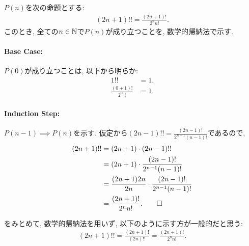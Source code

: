 \begin{proof*}
  $P(n)$を次の命題とする:
  \begin{align*}
    (2n+1)!!=\frac{(2n+1)!}{2^nn!}.
  \end{align*}
  このとき,
  全ての$n\in\mathbb{N}$で$P(n)$が成り立つことを,
  数学的帰納法で示す.

  \paragraph{Base Case:}
  $P(0)$が成り立つことは, 以下から明らか:
  \begin{align*}
    1!!&=1.\\
    \frac{(0+1)!}{2^00!}&=1.
  \end{align*}

  \paragraph{Induction Step:}
  $P(n-1)\implies P(n)$を示す.
  仮定から$(2n-1)!!=\frac{(2n-1)!}{2^{n-1}(n-1)!}$であるので,
  \begin{align*}
    (2n+1)!!
    &=(2n+1)\cdot (2n-1)!!\\
    &=(2n+1)\cdot \frac{(2n-1)!}{2^{n-1}(n-1)!}\\
    &=\frac{(2n+1)2n}{2n}\cdot \frac{(2n-1)!}{2^{n-1}(n-1)!}\\
    &=\frac{(2n+1)!}{2^{n}n!}
    .\qedhere
  \end{align*}
\end{proof*}

\begin{rem}
  をみとめて,
  数学的帰納法を用いず, 以下のように示す方が一般的だと思う:
  \begin{align*}
    (2n+1)!!=\frac{(2n+1)!}{(2n)!!}=\frac{(2n+1)!}{2^nn!}.
  \end{align*}
\end{rem}

